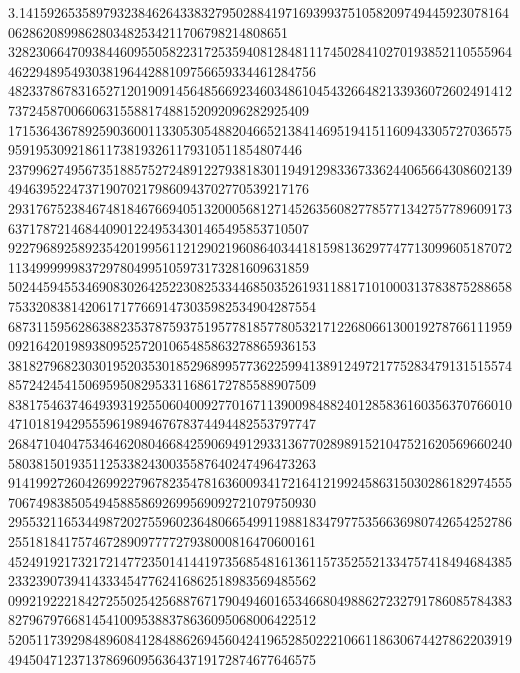 {\scriptsize
3.14159265358979323846264338327950288419716939937510582097494459230781640628620899862803482534211706798214808651\\
32823066470938446095505822317253594081284811174502841027019385211055596446229489549303819644288109756659334461284756\\
4823378678316527120190914564856692346034861045432664821339360726024914127372458700660631558817488152092096282925409\\
171536436789259036001133053054882046652138414695194151160943305727036575959195309218611738193261179310511854807446\\
2379962749567351885752724891227938183011949129833673362440656643086021394946395224737190702179860943702770539217176\\
2931767523846748184676694051320005681271452635608277857713427577896091736371787214684409012249534301465495853710507\\
9227968925892354201995611212902196086403441815981362977477130996051870721134999999837297804995105973173281609631859\\
50244594553469083026425223082533446850352619311881710100031378387528865875332083814206171776691473035982534904287554\\
68731159562863882353787593751957781857780532171226806613001927876611195909216420198938095257201065485863278865936153\\
38182796823030195203530185296899577362259941389124972177528347913151557485724245415069595082953311686172785588907509\\
83817546374649393192550604009277016711390098488240128583616035637076601047101819429555961989467678374494482553797747\\
26847104047534646208046684259069491293313677028989152104752162056966024058038150193511253382430035587640247496473263\\
91419927260426992279678235478163600934172164121992458631503028618297455570674983850549458858692699569092721079750930\\
29553211653449872027559602364806654991198818347977535663698074265425278625518184175746728909777727938000816470600161\\
45249192173217214772350141441973568548161361157352552133475741849468438523323907394143334547762416862518983569485562\\
09921922218427255025425688767179049460165346680498862723279178608578438382796797668145410095388378636095068006422512\\
52051173929848960841284886269456042419652850222106611863067442786220391949450471237137869609563643719172874677646575\\
}
